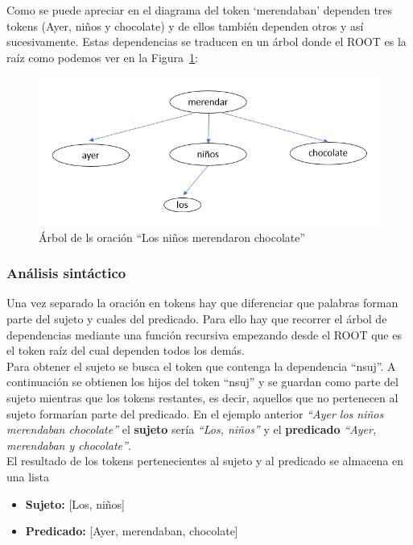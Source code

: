 Como se puede apreciar en el diagrama del token `merendaban' dependen tres tokens (Ayer, niños y chocolate) y de ellos también dependen otros y así sucesivamente. Estas dependencias se traducen en un árbol donde el ROOT es la raíz como podemos ver en la Figura~\ref {fig: grafo}:\\


\begin{figure}[]
	\centering
	\includegraphics[width=1\textwidth]{Imagenes/Fuentes/Text2LSE/grafo.png}
	\caption{ Árbol de ls oración ``Los niños merendaron chocolate'' }
	\label {fig: grafo}
\end{figure}



\subsubsection{Análisis sintáctico} 
Una vez separado la oración en tokens hay que diferenciar que palabras forman parte del sujeto y cuales del predicado. Para ello hay que recorrer el árbol de dependencias mediante una función recursiva empezando desde el ROOT que es el token raíz del cual dependen todos los demás.\\

Para obtener el sujeto se busca el token que contenga la dependencia ``nsuj''. A continuación se obtienen los hijos del token ``nsuj'' y se guardan como parte del sujeto mientras que los tokens restantes, es decir, aquellos que no pertenecen al sujeto formarían parte del predicado. En el ejemplo anterior \textit{``Ayer los niños merendaban chocolate''} el \textbf{sujeto} sería \textit{``Los, niños''} y el \textbf{predicado} \textit{``Ayer, merendaban y chocolate''}.\\

El resultado de los tokens pertenecientes al sujeto y al predicado se almacena en una lista
\begin{center}
	\begin{itemize}
		\item \textbf{Sujeto:}  [Los, niños]
		\item \textbf{Predicado:} [Ayer, merendaban, chocolate]
		
	\end{itemize}
\end{center}

